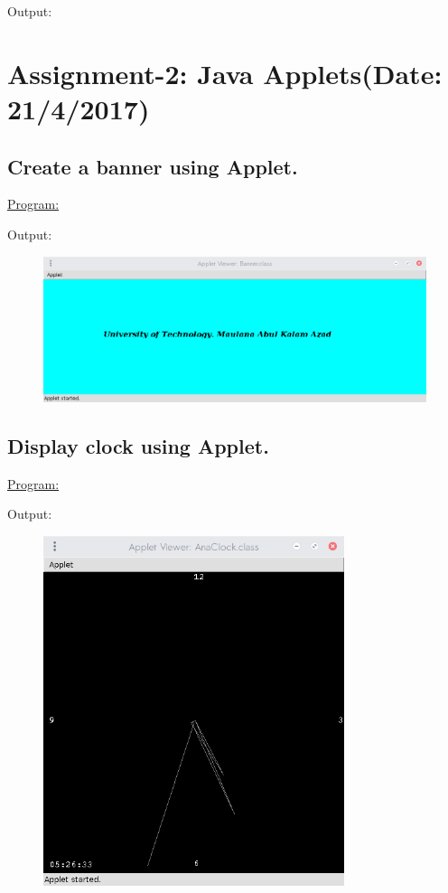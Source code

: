 \documentclass[a4paper,11pt]{article}
\begin{document}
Output:
\begin{figure}[H]
\centering
\end{figure}

\bigskip

\section{Assignment-2: Java Applets(Date: 21/4/2017)}
\subsection{Create a banner using Applet.}
\underline{Program:}


Output:
\begin{figure}[H]
\centering
\includegraphics[width=350pt,height=\textheight,keepaspectratio]{../assign2/pics/1.png}
\end{figure}

\bigskip

\subsection{Display clock using Applet.}
\underline{Program:}


Output:
\begin{figure}[H]
\centering
\includegraphics[width=250pt,height=\textheight,keepaspectratio]{../assign2/pics/2.png}
\end{figure}
\end{document}
